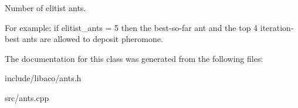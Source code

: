 Number of elitist ants. 

For example: if elitist\_\-ants = 5 then the best-so-far ant and the top 4 iteration-best ants are allowed to deposit pheromone. 

The documentation for this class was generated from the following files:\begin{CompactItemize}
\item 
include/libaco/ants.h\item 
src/ants.cpp\end{CompactItemize}
